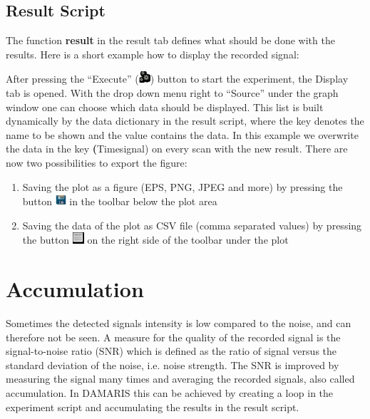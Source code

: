 \documentclass[12pt, a4paper, BCOR10mm, twoside, titlepage, headinclude]{scrbook}
\begin{document}
\subsection{Result Script}
The function \textbf{result} in the result tab defines what should be done with the results. Here is a short example how to display the recorded signal:

After pressing the ``Execute'' (\includegraphics[keepaspectratio, height=12pt]{execute_button}) button to start the experiment, the Display tab is opened. With the drop down menu right to ``Source'' under the graph window one can choose which data should be displayed. This list is built dynamically by the data dictionary in the result script, where the key denotes the name to be shown and the value contains the data. In this example we overwrite the data in the key \textbf(Timesignal) on every scan with the new result.
There are now two possibilities to export the figure:
\begin{enumerate}
\item Saving the plot as a figure (EPS, PNG, JPEG and more) by pressing the button \includegraphics[keepaspectratio, height=12pt]{save_as_picture3} in the toolbar below the plot area
\item Saving the data of the plot as CSV file (comma separated values) by pressing the button \includegraphics[keepaspectratio, height=12pt]{save_as_csv} on the right side of the toolbar under the plot
\end{enumerate}
 
\section{Accumulation}\label{advanced}
Sometimes the detected signals intensity is low compared to the noise, and can therefore not be seen. A measure for the quality of the recorded signal is the signal-to-noise ratio (SNR) which is defined as the ratio of signal versus the standard deviation of the noise, i.e. noise strength. 
The SNR is improved by measuring the signal many times and averaging the recorded signals, also called accumulation.
In \textsf{DAMARIS} this can be achieved by creating a loop in the experiment script and accumulating the results in the result script.


\end{document}
